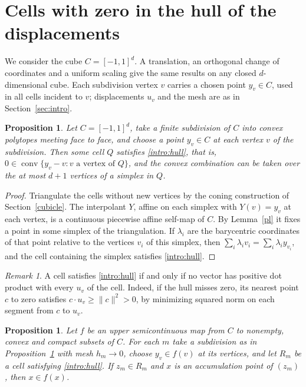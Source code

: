 \documentclass[11pt]{amsart}
\newtheorem{prop}[thm]{Proposition}
\theoremstyle{definition}
\theoremstyle{remark}
\newtheorem{rem}[thm]{Remark}
\numberwithin{equation}{section}
\DeclareMathOperator{\conv}{conv}
\begin{document}
\section{Cells with zero in the hull of the displacements}\label{kakutani}
We consider the cube $C=[-1,1]^d$. A translation, an orthogonal change of coordinates and a uniform scaling give the same results on any closed $d$-dimensional cube. Each subdivision vertex $v$ carries a chosen point $y_v\in C$, used in all cells incident to $v$; displacements $u_v$ and the mesh are as in Section~\ref{sec:intro}.

\begin{prop}\label{prop:balance}
Let $C=[-1,1]^d$, take a finite subdivision of $C$ into convex polytopes meeting face to face, and choose a point $y_v\in C$ at each vertex $v$ of the subdivision. Then some cell $Q$ satisfies \eqref{intro:hull}, that is, $0\in\conv\{y_v-v:v\text{ a vertex of }Q\}$, and the convex combination can be taken over the at most $d+1$ vertices of a simplex in $Q$.
\end{prop}

\begin{proof}
Triangulate the cells without new vertices by the coning construction of Section~\ref{cubicle}. The interpolant $Y$, affine on each simplex with $Y(v)=y_v$ at each vertex, is a continuous piecewise affine self-map of $C$. By Lemma~\ref{pl} it fixes a point in some simplex of the triangulation. If $\lambda_i$ are the barycentric coordinates of that point relative to the vertices $v_i$ of this simplex, then $\sum_i\lambda_i v_i=\sum_i\lambda_i y_{v_i}$, and the cell containing the simplex satisfies \eqref{intro:hull}.
\end{proof}

\begin{rem}\label{rem:sep}
A cell satisfies \eqref{intro:hull} if and only if no vector has positive dot product with every $u_v$ of the cell. Indeed, if the hull misses zero, its nearest point $c$ to zero satisfies $c\cdot u_v\ge\|c\|^2>0$, by minimizing squared norm on each segment from $c$ to $u_v$.
\end{rem}

\begin{prop}\label{prop:limit}
Let $f$ be an upper semicontinuous map from $C$ to nonempty, convex and compact subsets of $C$. For each $m$ take a subdivision as in Proposition~\ref{prop:balance} with mesh $h_m\to0$, choose $y_v\in f(v)$ at its vertices, and let $R_m$ be a cell satisfying \eqref{intro:hull}. If $z_m\in R_m$ and $x$ is an accumulation point of $(z_m)$, then $x\in f(x)$.
\end{prop}
\end{document}

